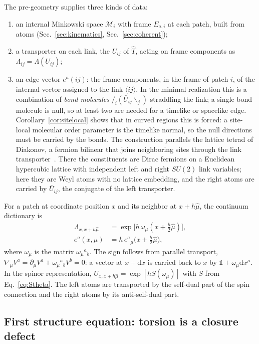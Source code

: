 \documentclass[reprint,aps,prd,amsmath,amssymb,superscriptaddress,nofootinbib,floatfix]{revtex4-2}
\theoremstyle{plain}
\theoremstyle{definition}
\theoremstyle{remark}
\newcommand{\Lat}{\ensuremath{/}}                 %
\newcommand{\Rat}{\ensuremath{\backslash}}        %
\newcommand{\dd}{\mathrm{d}}
\newcommand{\Tc}{\hat{T}}
\newcommand{\one}{\mathbb{1}}
\begin{document}
The pre-geometry supplies three kinds of data:
\begin{enumerate}
\item an internal Minkowski space $\mathcal{M}_i$ with frame $E_{a,i}$ at each patch, built from atoms
(Sec.~\ref{sec:kinematics}, Sec.~\ref{sec:coherent});
\item a transporter on each link, the $U_{ij}$ of $\Tc$, acting on frame components as
$\Lambda_{ij}=\Lambda(U_{ij})$;
\item an edge vector $e^a(ij)$: the frame components, in the frame of patch $i$, of the internal vector
assigned to the link $\langle ij\rangle$. In the minimal realization this is a combination of
\emph{bond molecules} $\Lat_i(\bar U_{ij}\Rat_j)$ straddling the link; a single bond molecule is null, so at least two
are needed for a timelike or spacelike edge. Corollary~\ref{cor:sitelocal} shows that in curved regions this is forced:
a site-local molecular order parameter is the timelike normal, so the null directions must be carried by the bonds.
The construction parallels the lattice tetrad of Diakonov, a fermion bilinear that joins neighboring sites through the
link transporter~\cite{Diakonov2011,VladimirovDiakonov2012}. There the constituents are Dirac fermions on a Euclidean
hypercubic lattice with independent left and right $SU(2)$ link variables; here they are Weyl atoms with no lattice
embedding, and the right atoms are carried by $\bar U_{ij}$, the conjugate of the left transporter.
\end{enumerate}
For a patch at coordinate position $x$ and its neighbor at $x+h\hat\mu$, the continuum dictionary is
\begin{equation}
\begin{aligned}
\Lambda_{x,x+h\hat\mu}&=\exp\!\big[h\,\omega_\mu(x+\tfrac h2\hat\mu)\big],\\
e^a(x,\mu)&=h\,e^a{}_\mu\big(x+\tfrac h2\hat\mu\big),
\end{aligned}
\label{eq:dictionary}
\end{equation}
where $\omega_\mu$ is the matrix $\omega_\mu{}^a{}_b$. The sign follows from parallel transport,
$\nabla_\mu V^a=\partial_\mu V^a+\omega_\mu{}^a{}_bV^b=0$: a vector at $x+\dd x$ is carried back to $x$ by
$\one+\omega_\mu\dd x^\mu$. In the spinor representation, $U_{x,x+h\hat\mu}=\exp[hS(\omega_\mu)]$ with $S$ from
Eq.~\eqref{eq:Stheta}. The left atoms are transported by the self-dual part of the spin connection and the
right atoms by its anti-self-dual part.

\subsection{First structure equation: torsion is a closure defect}
\end{document}
